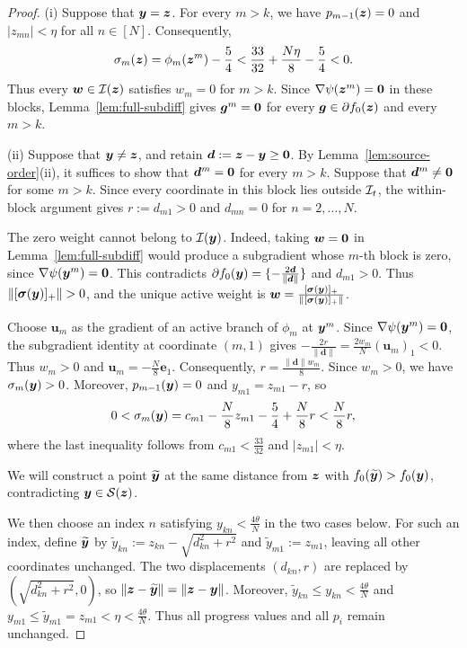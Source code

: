 \begin{proof}
\textrm{(i)} Suppose that $\bm{y}=\bm{z}$.
For every $m>k$, we have $p_{m-1}(\bm{z})=0$ and
$|z_{mn}|<\eta$ for all $n\in[N]$. Consequently,
\[
 \sigma_m(\bm{z})
 =\phi_m(\bm{z}^m)-\frac54
 <\frac{33}{32}+\frac{N\eta}{8}-\frac54
 <0.
\]
Thus every $\bm w\in\mathcal I(\bm{z})$ satisfies
$w_m=0$ for $m>k$.
Since $\nabla\psi(\bm{z}^m)={\mathbf 0}$ in these blocks,
Lemma~\ref{lem:full-subdiff} gives
$\bm{g}^m={\mathbf 0}$ for every $\bm{g}\in\partial f_0(\bm{z})$
and every $m>k$.

\textrm{(ii)} Suppose that $\bm{y}\ne\bm{z}$, and retain
$\bm d:=\bm{z}-\bm{y}\ge{\mathbf 0}$.
By Lemma~\ref{lem:source-order}(ii), it suffices
to show that $\bm d^m={\mathbf 0}$ for every $m>k$.
Suppose that $\bm d^m\ne{\mathbf 0}$ for some $m>k$.
Since every coordinate in this block lies outside
${\cal I}_t$, the within-block argument gives
$r:=d_{m1}>0$ and $d_{mn}=0$ for $n=2,\ldots,N$.

The zero weight cannot belong to $\mathcal I(\bm{y})$.
Indeed, taking $\bm w={\mathbf 0}$ in
Lemma~\ref{lem:full-subdiff} would produce a
subgradient whose $m$-th block is zero, since
$\nabla\psi(\bm{y}^m)={\mathbf 0}$.
This contradicts
$\partial f_0(\bm{y})=\{-\tfrac{2\bm d}{\|\bm d\|}\}$
and $d_{m1}>0$.
Thus $\|[\boldsymbol\sigma(\y)]_+\|>0$, and
the unique active weight is
$\bm w=\tfrac{[\boldsymbol\sigma(\bm{y})]_+}
{\|[\boldsymbol\sigma(\bm{y})]_+\|}$.

Choose $\bm u_m$ as the gradient of an active
branch of $\phi_m$ at $\bm{y}^m$.
Since $\nabla\psi(\bm{y}^m)={\mathbf 0}$, the subgradient
identity at coordinate $(m,1)$ gives
$-\tfrac{2r}{\|\bm d\|}
=\tfrac{2w_m}{N}(\bm u_m)_1<0$.
Thus $w_m>0$ and $\bm u_m=-\tfrac N8\bm e_1$.
Consequently, $r=\tfrac{\|\bm d\|w_m}{8}$.
Since $w_m>0$, we have $\sigma_m(\bm{y})>0$.
Moreover, $p_{m-1}(\bm{y})=0$ and
$y_{m1}=z_{m1}-r$, so
\[
 0<\sigma_m(\bm{y})
 =c_{m1}-\frac N8z_{m1}-\frac54+\frac N8r
 <\frac N8r,
\]
where the last inequality follows from
$c_{m1}<\tfrac{33}{32}$ and $|z_{m1}|<\eta$.

We will construct a point $\widetilde{\bm{y}}$ at the same
distance from $\bm{z}$ with $f_0(\widetilde{\bm{y}})>f_0(\bm{y})$,
contradicting $\bm{y}\in\mathcal S(\bm{z})$.

We then choose an index $n$ satisfying
$y_{kn}<\tfrac{4\theta}{N}$ in the two cases below.
For such an index, define $\widetilde{\bm{y}}$ by
$\widetilde y_{kn}:=z_{kn}-\sqrt{d_{kn}^2+r^2}$
and $\widetilde y_{m1}:=z_{m1}$,
leaving all other coordinates unchanged.
The two displacements $(d_{kn},r)$ are replaced
by $(\sqrt{d_{kn}^2+r^2},0)$, so
$\|\bm{z}-\widetilde{\bm{y}}\|=\|\bm{z}-\bm{y}\|$.
Moreover,
$\widetilde y_{kn}\le y_{kn}<\tfrac{4\theta}{N}$
and
$y_{m1}\le\widetilde y_{m1}=z_{m1}
<\eta<\tfrac{4\theta}{N}$.
Thus all progress values and all $p_i$
remain unchanged.


\end{proof}
